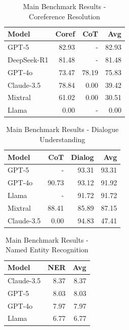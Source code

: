 \begin{table}[htbp]
\centering
\caption{Main Benchmark Results - Coreference Resolution}
\label{tab:coref_main_results}
\begin{tabular}{lrrr}
\toprule
Model & Coref & CoT & \textbf{Avg} \\
\midrule
GPT-5 & 82.93 & - & 82.93 \\
DeepSeek-R1 & 81.48 & - & 81.48 \\
GPT-4o & 73.47 & 78.19 & 75.83 \\
Claude-3.5 & 78.84 & 0.00 & 39.42 \\
Mixtral & 61.02 & 0.00 & 30.51 \\
Llama & 0.00 & - & 0.00 \\
\bottomrule
\end{tabular}
\end{table}



\begin{table}[htbp]
\centering
\caption{Main Benchmark Results - Dialogue Understanding}
\label{tab:dialogue_main_results}
\begin{tabular}{lrrr}
\toprule
Model & CoT & Dialog & \textbf{Avg} \\
\midrule
GPT-5 & - & 93.31 & 93.31 \\
GPT-4o & 90.73 & 93.12 & 91.92 \\
Llama & - & 91.72 & 91.72 \\
Mixtral & 88.41 & 85.89 & 87.15 \\
Claude-3.5 & 0.00 & 94.83 & 47.41 \\
\bottomrule
\end{tabular}
\end{table}



\begin{table}[htbp]
\centering
\caption{Main Benchmark Results - Named Entity Recognition}
\label{tab:ner_main_results}
\begin{tabular}{lrr}
\toprule
Model & NER & \textbf{Avg} \\
\midrule
Claude-3.5 & 8.37 & 8.37 \\
GPT-5 & 8.03 & 8.03 \\
GPT-4o & 7.97 & 7.97 \\
Llama & 6.77 & 6.77 \\
\bottomrule
\end{tabular}
\end{table}

